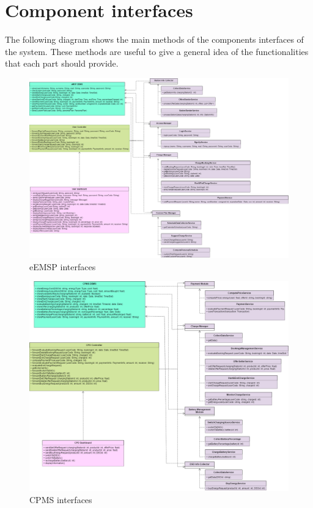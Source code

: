 \documentclass[12pt]{report}
\begin{document}
\section{Component interfaces}
The following diagram shows the main methods of the components interfaces of the system. These methods are useful to give a general idea of the functionalities that each part should provide.\\
\begin{figure}[h]
    \hspace*{-2cm}
    \centering
    \includegraphics[width = 1.3\textwidth]{assets/interface_emsp.png}
    \caption{eEMSP interfaces}

\end{figure}
\begin{figure}[h]
    \hspace*{-2cm}
    \centering
    \includegraphics[width = 1.3\textwidth]{assets/interface_cpms.png}
    \caption{CPMS interfaces}
\end{figure}
\clearpage
\end{document}
